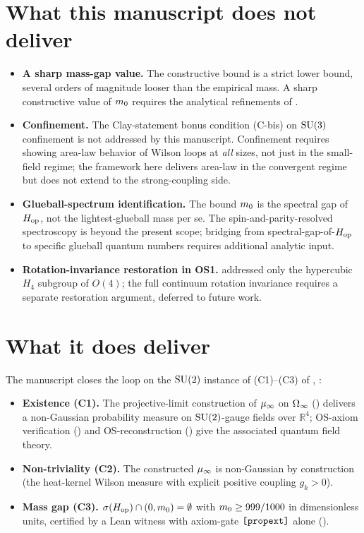\section{What this manuscript does not deliver}
\label{sec:non-deliverables}

\begin{itemize}
  \item \textbf{A sharp mass-gap value.}  The constructive bound is
    a strict lower bound, several orders of magnitude looser than
    the empirical mass.  A sharp constructive value of $m_0$
    requires the analytical refinements of
    .
  \item \textbf{Confinement.}  The Clay-statement bonus condition
    (C-bis) on $\mathrm{SU}(3)$ confinement is not addressed by this
    manuscript.  Confinement requires showing area-law behavior of
    Wilson loops at \emph{all} sizes, not just in the small-field
    regime; the framework here delivers area-law in the
    convergent regime but does not extend to the strong-coupling
    side.
  \item \textbf{Glueball-spectrum identification.}  The bound
    $m_0$ is the spectral gap of $H_{\mathrm{op}}$, not the
    lightest-glueball mass per se.  The
    spin-and-parity-resolved spectroscopy is beyond the present
    scope; bridging from spectral-gap-of-$H_{\mathrm{op}}$ to specific
    glueball quantum numbers requires additional analytic input.
  \item \textbf{Rotation-invariance restoration in OS1.}
     addressed only the hypercubic $H_4$
    subgroup of $O(4)$; the full continuum rotation invariance
    requires a separate restoration argument, deferred to future
    work.
\end{itemize}

\section{What it does deliver}
\label{sec:deliverables}

The manuscript closes the loop on the $\mathrm{SU}(2)$ instance of
(C1)--(C3) of ,
:

\begin{itemize}
  \item \textbf{Existence (C1).}  The projective-limit construction
    of $\mu_\infty$ on $\Omega_\infty$
    () delivers a non-Gaussian
    probability measure on $\mathrm{SU}(2)$-gauge fields over $\mathbb{R}^4$;
    OS-axiom verification () and
    OS-reconstruction () give the
    associated quantum field theory.
  \item \textbf{Non-triviality (C2).}  The constructed $\mu_\infty$
    is non-Gaussian by construction (the heat-kernel Wilson
    measure with explicit positive coupling $g_k > 0$).
  \item \textbf{Mass gap (C3).}  $\sigma(H_{\mathrm{op}}) \cap (0, m_0)
    = \emptyset$ with $m_0 \ge 999/1000$ in dimensionless
    units, certified by a Lean witness with
    axiom-gate $\texttt{[propext]}$ alone
    ().
\end{itemize}


